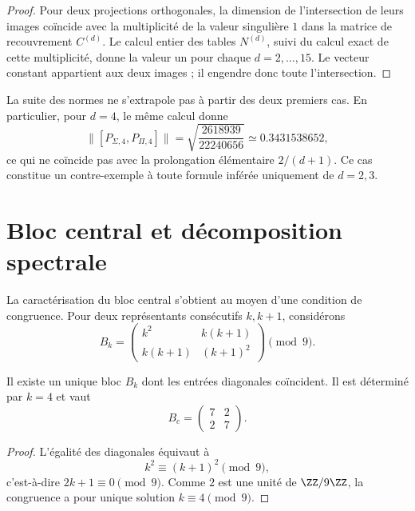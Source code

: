\begin{proof}
Pour deux projections orthogonales, la dimension de l'intersection de leurs
images coïncide avec la multiplicité de la valeur singulière \(1\) dans la matrice
de recouvrement \(C^{(d)}\). Le calcul entier des tables
\(N^{(d)}\), suivi du calcul exact de cette multiplicité, donne la valeur un
pour chaque \(d=2,\ldots,15\). Le vecteur constant appartient aux deux images ;
il engendre donc toute l'intersection.
\end{proof}

La suite des normes ne s'extrapole pas à partir des deux premiers cas.
En particulier, pour \(d=4\), le même calcul donne
\[
 \|[P_{\Sigma,4},P_{\Pi,4}]\|
 =\sqrt{\frac{2618939}{22240656}}
 \simeq0.3431538652,
\]
ce qui ne coïncide pas avec la prolongation élémentaire \(2/(d+1)\). Ce cas
constitue un contre-exemple à toute formule inférée uniquement de
\(d=2,3\).

\section{Bloc central et décomposition spectrale}

La caractérisation du bloc central s'obtient au moyen d'une condition de
congruence. Pour deux représentants consécutifs \(k,k+1\), considérons
\[
B_k=
\begin{pmatrix}
k^2&k(k+1)\\
k(k+1)&(k+1)^2
\end{pmatrix}\pmod9.
\]

\begin{theorem}
\label{thm:app-bloque-central}
Il existe un unique bloc \(B_k\) dont les entrées diagonales coïncident. Il est
déterminé par \(k=4\) et vaut
\[
B_c=
\begin{pmatrix}7&2\\2&7\end{pmatrix}.
\]
\end{theorem}

\begin{proof}
L'égalité des diagonales équivaut à
\[
k^2\equiv(k+1)^2\pmod9,
\]
c'est-à-dire \(2k+1\equiv0\pmod9\). Comme \(2\) est une unité de
\(\ZZ/9\ZZ\), la congruence a pour unique solution \(k\equiv4\pmod9\).
\end{proof}


